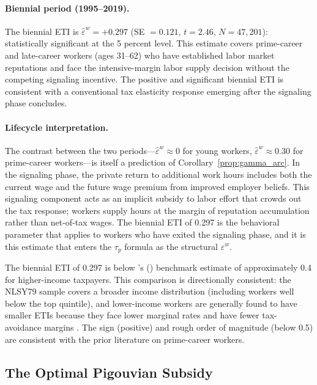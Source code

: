 \documentclass[12pt]{article}
\theoremstyle{definition}
\theoremstyle{remark}
\newcommand{\citepos}[1]{\citeauthor{#1}'s (\citeyear{#1})}
\begin{document}
\paragraph{Biennial period (1995--2019).} The biennial ETI is $\hat{\varepsilon}^w = +0.297$
(SE $= 0.121$, $t = 2.46$, $N = 47{,}201$): statistically significant at the 5 percent level.
This estimate covers prime-career and late-career workers (ages 31--62) who have established
labor market reputations and face the intensive-margin labor supply decision without the
competing signaling incentive. The positive and significant biennial ETI is consistent with
a conventional tax elasticity response emerging after the signaling phase concludes.

\paragraph{Lifecycle interpretation.} The contrast between the two periods—$\hat{\varepsilon}^w
\approx 0$ for young workers, $\hat{\varepsilon}^w \approx 0.30$ for prime-career workers—is
itself a prediction of Corollary~\ref{prop:gamma_arc}. In the signaling phase, the private
return to additional work hours includes both the current wage and the future wage premium
from improved employer beliefs. This signaling component acts as an implicit subsidy to labor
effort that crowds out the tax response; workers supply hours at the margin of reputation
accumulation rather than net-of-tax wages. The biennial ETI of 0.297 is the behavioral
parameter that applies to workers who have exited the signaling phase, and it is this estimate
that enters the $\tau_p$ formula as the structural $\varepsilon^w$.

The biennial ETI of 0.297 is below \citepos{gruber2002elasticity} benchmark estimate of
approximately 0.4 for higher-income taxpayers. This comparison is directionally consistent:
the NLSY79 sample covers a broader income distribution (including workers well below the top
quintile), and lower-income workers are generally found to have smaller ETIs because they
face lower marginal rates and have fewer tax-avoidance margins \citep{saez2012elasticity}.
The sign (positive) and rough order of magnitude (below 0.5) are consistent with the prior
literature on prime-career workers.

\subsection{The Optimal Pigouvian Subsidy}
\end{document}
